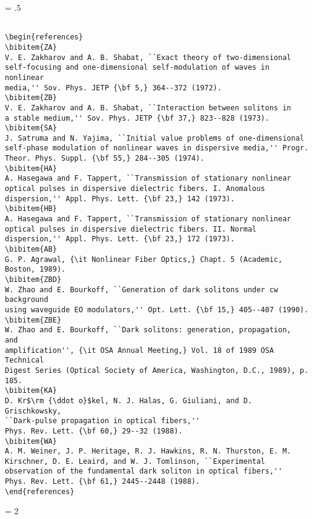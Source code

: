 \newpage
\baselineskip = .5\baselineskip  %
\begin{verbatim}

\begin{references}
\bibitem{ZA}
V. E. Zakharov and A. B. Shabat, ``Exact theory of two-dimensional
self-focusing and one-dimensional self-modulation of waves in nonlinear
media,'' Sov. Phys. JETP {\bf 5,} 364--372 (1972).
\bibitem{ZB}
V. E. Zakharov and A. B. Shabat, ``Interaction between solitons in
a stable medium,'' Sov. Phys. JETP {\bf 37,} 823--828 (1973).
\bibitem{SA}
J. Satruma and N. Yajima, ``Initial value problems of one-dimensional
self-phase modulation of nonlinear waves in dispersive media,'' Progr.
Theor. Phys. Suppl. {\bf 55,} 284--305 (1974).
\bibitem{HA}
A. Hasegawa and F. Tappert, ``Transmission of stationary nonlinear
optical pulses in dispersive dielectric fibers. I. Anomalous
dispersion,'' Appl. Phys. Lett. {\bf 23,} 142 (1973).
\bibitem{HB}
A. Hasegawa and F. Tappert, ``Transmission of stationary nonlinear
optical pulses in dispersive dielectric fibers. II. Normal
dispersion,'' Appl. Phys. Lett. {\bf 23,} 172 (1973).
\bibitem{AB}
G. P. Agrawal, {\it Nonlinear Fiber Optics,} Chapt. 5 (Academic,
Boston, 1989).
\bibitem{ZBD}
W. Zhao and E. Bourkoff, ``Generation of dark solitons under cw background
using waveguide EO modulators,'' Opt. Lett. {\bf 15,} 405--407 (1990).
\bibitem{ZBE}
W. Zhao and E. Bourkoff, ``Dark solitons: generation, propagation,  and
amplification'', {\it OSA Annual Meeting,} Vol. 18 of 1989 OSA Technical
Digest Series (Optical Society of America, Washington, D.C., 1989), p. 185.
\bibitem{KA}
D. Kr$\rm {\ddot o}$kel, N. J. Halas, G. Giuliani, and D. Grischkowsky,
``Dark-pulse propagation in optical fibers,''
Phys. Rev. Lett. {\bf 60,} 29--32 (1988).
\bibitem{WA}
A. M. Weiner, J. P. Heritage, R. J. Hawkins, R. N. Thurston, E. M.
Kirschner, D. E. Leaird, and W. J. Tomlinson, ``Experimental
observation of the fundamental dark soliton in optical fibers,''
Phys. Rev. Lett. {\bf 61,} 2445--2448 (1988).
\end{references}

\end{verbatim}
\newpage
\baselineskip = 2\baselineskip  %



